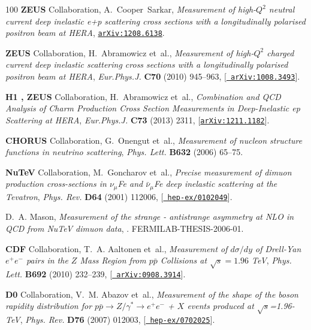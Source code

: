 \begin{thebibliography}{100}
{\bf ZEUS} Collaboration, A.~Cooper~Sarkar, {\it {Measurement of high-$Q^2$
  neutral current deep inelastic e+p scattering cross sections with a
  longitudinally polarised positron beam at HERA}},
  \href{http://arxiv.org/abs/1208.6138}{{\tt arXiv:1208.6138}}.

{\bf ZEUS} Collaboration, H.~Abramowicz et~al., {\it {Measurement of high-$Q^2$
  charged current deep inelastic scattering cross sections with a
  longitudinally polarised positron beam at HERA}},  {\em Eur.Phys.J.} {\bf
  C70} (2010) 945--963, [\href{http://arxiv.org/abs/1008.3493}{{\tt
  arXiv:1008.3493}}].

{\bf H1 , ZEUS} Collaboration, H.~Abramowicz et~al., {\it {Combination and QCD
  Analysis of Charm Production Cross Section Measurements in Deep-Inelastic ep
  Scattering at HERA}},  {\em Eur.Phys.J.} {\bf C73} (2013) 2311,
  [\href{http://arxiv.org/abs/1211.1182}{{\tt arXiv:1211.1182}}].

{\bf CHORUS} Collaboration, G.~Onengut et~al., {\it {Measurement of nucleon
  structure functions in neutrino scattering}},  {\em Phys. Lett.} {\bf B632}
  (2006) 65--75.

{\bf NuTeV} Collaboration, M.~Goncharov et~al., {\it {Precise measurement of
  dimuon production cross-sections in $\nu_{\mu}$Fe and $\bar{\nu}_{\mu}$Fe
  deep inelastic scattering at the Tevatron}},  {\em Phys. Rev.} {\bf D64}
  (2001) 112006, [\href{http://arxiv.org/abs/hep-ex/0102049}{{\tt
  hep-ex/0102049}}].

D.~A. Mason, {\it {Measurement of the strange - antistrange asymmetry at NLO in
  QCD from NuTeV dimuon data}}, . FERMILAB-THESIS-2006-01.

{\bf CDF} Collaboration, T.~A. Aaltonen et~al., {\it {Measurement of
  $d\sigma/dy$ of Drell-Yan $e^+e^-$ pairs in the $Z$ Mass Region from
  $p\bar{p}$ Collisions at $\sqrt{s}=1.96$ TeV}},  {\em Phys. Lett.} {\bf B692}
  (2010) 232--239, [\href{http://arxiv.org/abs/0908.3914}{{\tt
  arXiv:0908.3914}}].

{\bf D0} Collaboration, V.~M. Abazov et~al., {\it {Measurement of the shape of
  the boson rapidity distribution for $p \bar{p} \to Z/\gamma^* \to e^{+}
  e^{-}$ + $X$ events produced at $\sqrt{s}$=1.96-TeV}},  {\em Phys. Rev.} {\bf
  D76} (2007) 012003, [\href{http://arxiv.org/abs/hep-ex/0702025}{{\tt
  hep-ex/0702025}}].


\end{thebibliography}
